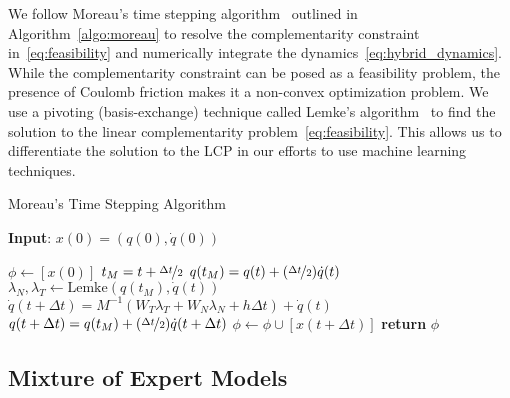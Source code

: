 We follow Moreau's time stepping algorithm~\cite{glocker2005formulation}
outlined in Algorithm~\eqref{algo:moreau} to resolve the complementarity
constraint in~\eqref{eq:feasibility} and numerically integrate the
dynamics~\eqref{eq:hybrid_dynamics}. While the complementarity constraint can be
posed as a feasibility problem, the presence of Coulomb friction makes it a
non-convex optimization problem. We use a pivoting (basis-exchange) technique
called Lemke's algorithm~\cite{acary2008numerical} to find the solution to the
linear complementarity problem~\eqref{eq:feasibility}. This allows us to
differentiate the solution to the LCP in our efforts to use machine learning
techniques.

\begin{algorithm}[H]
    \caption{Moreau's Time Stepping Algorithm}
    \label{algo:moreau}
    \small
    \hspace*{\algorithmicindent} \textbf{Input}: $x(0) = (q(0), \dot{q}(0))$
    \begin{algorithmic}[1]
      \State $\phi \leftarrow  [x(0)]$ 
           
            \State $t_M = t + \nicefrac{\Delta t}{2}$
            \State $q(t_M) = q(t) +  (\nicefrac{\Delta t}{2}) \dot{q}(t) $
            \State $\lambda_N, \lambda_T \leftarrow \text{Lemke}(q(t_M), \dot{q}(t))$ 
            \State $\dot{q}(t+\Delta t) = M^{-1}(W_T \lambda_T + W_N \lambda_N + h\Delta t) + \dot{q}(t)$
            \State $q(t + \Delta t) =  q(t_M) +  (\nicefrac{\Delta t}{2})\dot{q}(t+\Delta t)$
            \State $\phi \leftarrow \phi \cup [x(t+\Delta t)]$
          \EndFor
        \State \textbf{return} $\phi$
    \end{algorithmic}
\end{algorithm}


\subsection{Mixture of Expert Models}
\label{ssec:mixture_of_experts}

